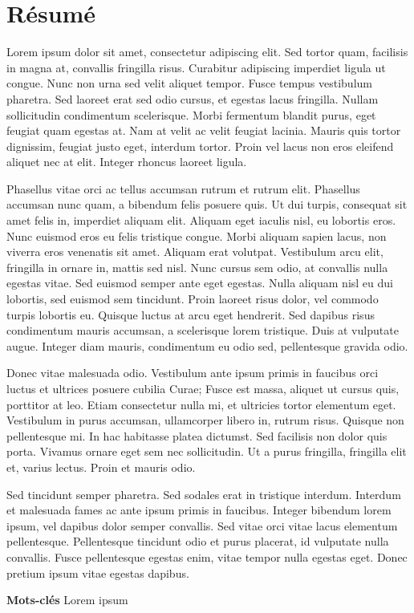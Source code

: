 \chapter*{Résumé}

Lorem ipsum dolor sit amet, consectetur adipiscing elit. Sed tortor quam, facilisis in magna at, convallis fringilla risus. Curabitur adipiscing imperdiet ligula ut congue. Nunc non urna sed velit aliquet tempor. Fusce tempus vestibulum pharetra. Sed laoreet erat sed odio cursus, et egestas lacus fringilla. Nullam sollicitudin condimentum scelerisque. Morbi fermentum blandit purus, eget feugiat quam egestas at. Nam at velit ac velit feugiat lacinia. Mauris quis tortor dignissim, feugiat justo eget, interdum tortor. Proin vel lacus non eros eleifend aliquet nec at elit. Integer rhoncus laoreet ligula.

Phasellus vitae orci ac tellus accumsan rutrum et rutrum elit. Phasellus accumsan nunc quam, a bibendum felis posuere quis. Ut dui turpis, consequat sit amet felis in, imperdiet aliquam elit. Aliquam eget iaculis nisl, eu lobortis eros. Nunc euismod eros eu felis tristique congue. Morbi aliquam sapien lacus, non viverra eros venenatis sit amet. Aliquam erat volutpat. Vestibulum arcu elit, fringilla in ornare in, mattis sed nisl. Nunc cursus sem odio, at convallis nulla egestas vitae. Sed euismod semper ante eget egestas. Nulla aliquam nisl eu dui lobortis, sed euismod sem tincidunt. Proin laoreet risus dolor, vel commodo turpis lobortis eu. Quisque luctus at arcu eget hendrerit. Sed dapibus risus condimentum mauris accumsan, a scelerisque lorem tristique. Duis at vulputate augue. Integer diam mauris, condimentum eu odio sed, pellentesque gravida odio.

Donec vitae malesuada odio. Vestibulum ante ipsum primis in faucibus orci luctus et ultrices posuere cubilia Curae; Fusce est massa, aliquet ut cursus quis, porttitor at leo. Etiam consectetur nulla mi, et ultricies tortor elementum eget. Vestibulum in purus accumsan, ullamcorper libero in, rutrum risus. Quisque non pellentesque mi. In hac habitasse platea dictumst. Sed facilisis non dolor quis porta. Vivamus ornare eget sem nec sollicitudin. Ut a purus fringilla, fringilla elit et, varius lectus. Proin et mauris odio.

Sed tincidunt semper pharetra. Sed sodales erat in tristique interdum. Interdum et malesuada fames ac ante ipsum primis in faucibus. Integer bibendum lorem ipsum, vel dapibus dolor semper convallis. Sed vitae orci vitae lacus elementum pellentesque. Pellentesque tincidunt odio et purus placerat, id vulputate nulla convallis. Fusce pellentesque egestas enim, vitae tempor nulla egestas eget. Donec pretium ipsum vitae egestas dapibus.

\textbf{Mots-clés} Lorem ipsum